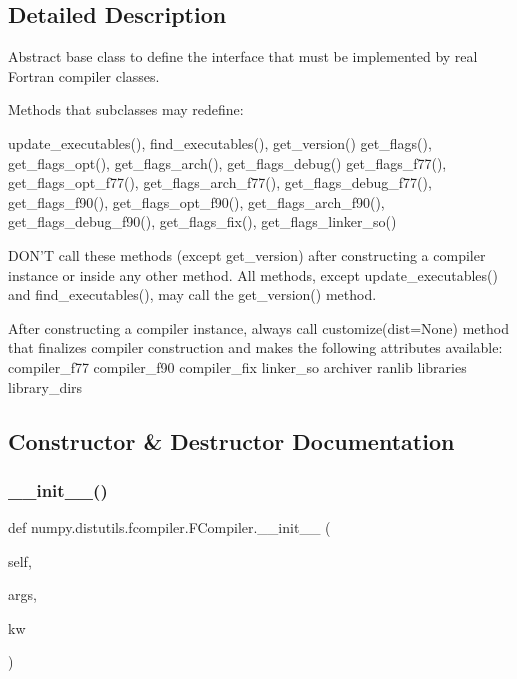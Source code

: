 \subsection{Detailed Description}
\begin{DoxyVerb}Abstract base class to define the interface that must be implemented
by real Fortran compiler classes.

Methods that subclasses may redefine:

    update_executables(), find_executables(), get_version()
    get_flags(), get_flags_opt(), get_flags_arch(), get_flags_debug()
    get_flags_f77(), get_flags_opt_f77(), get_flags_arch_f77(),
    get_flags_debug_f77(), get_flags_f90(), get_flags_opt_f90(),
    get_flags_arch_f90(), get_flags_debug_f90(),
    get_flags_fix(), get_flags_linker_so()

DON'T call these methods (except get_version) after
constructing a compiler instance or inside any other method.
All methods, except update_executables() and find_executables(),
may call the get_version() method.

After constructing a compiler instance, always call customize(dist=None)
method that finalizes compiler construction and makes the following
attributes available:
  compiler_f77
  compiler_f90
  compiler_fix
  linker_so
  archiver
  ranlib
  libraries
  library_dirs
\end{DoxyVerb}
 

\subsection{Constructor \& Destructor Documentation}
\mbox{\label{classnumpy_1_1distutils_1_1fcompiler_1_1FCompiler_ab30309afa176125222ffdd36b6b5b6e4}} 
\subsubsection{\texorpdfstring{\+\_\+\+\_\+init\+\_\+\+\_\+()}{\_\_init\_\_()}}
{\footnotesize\ttfamily def numpy.\+distutils.\+fcompiler.\+F\+Compiler.\+\_\+\+\_\+init\+\_\+\+\_\+ (\begin{DoxyParamCaption}\item[{}]{self,  }\item[{}]{args,  }\item[{}]{kw }\end{DoxyParamCaption})}



